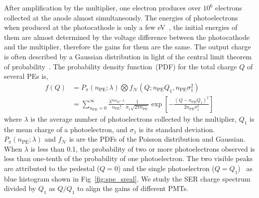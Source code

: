 After amplification by the multiplier, one electron produces over $10^6$ electrons collected at the anode almost simultaneously.
The energies of photoelectrons when produced at the photocathode is only a few \si{eV}~\cite{Nathan1970TheED},
the initial energies of them are almost determined by the voltage difference
between the photocathode and the multiplier, therefore the gains for them are the same.
The output charge is often described by a Gaussian distribution in light of the central limit theorem of probability~\cite{1994Absolute}.
The probability density function~(PDF) for the total charge $Q$ of several PEs is,
\begin{equation}
    \begin{aligned}
        f(Q) & = P_{\pi}(n_{\mathrm{PE}};\lambda)\bigotimes f_{\mathcal{N}}(Q; n_{\mathrm{PE}}Q_1,n_{\mathrm{PE}}\sigma_1^2) \\
             & =\sum_{n_{\mathrm{PE}} = 0}^{\infty}\frac{\lambda^{n_{\mathrm{PE}}} e^{-\lambda}}{n_{\mathrm{PE}}!}
        \frac{1}{\sigma_1\sqrt{2\pi n_{\mathrm{PE}}}}\exp\left[-\frac{{(Q-n_{\mathrm{PE}}Q_1)}^2}{2n_{\mathrm{PE}}\sigma_1^2}\right]
    \end{aligned}
    \label{eq:sreal}
\end{equation}
where $\lambda$ is the average number of photoelectrons collected by the multiplier, $Q_1$ is the mean charge of a photoelectron,
and $\sigma_1$ is its standard deviation.\@
$P_\pi(n_{\mathrm{PE}};\lambda)$ and \(f_{\mathcal{N}}\) is are the PDFs of the Poisson distribution and Gaussian.
When $\lambda$ is less than 0.1,
the probability of two or more photoelectrons observed is less than one-tenth of the probability of one photoelectron.
The two visible peaks are attributed to the pedestal ($Q=0$) and the single photoelectron ($Q=Q_1$)~\cite{Xia_2015} as blue histogram shown in Fig~\ref{fig:spe_sreal}.
We study the SER charge spectrum divided by $Q_1$ as $Q/Q_1$ to align the gains of different PMTs.

